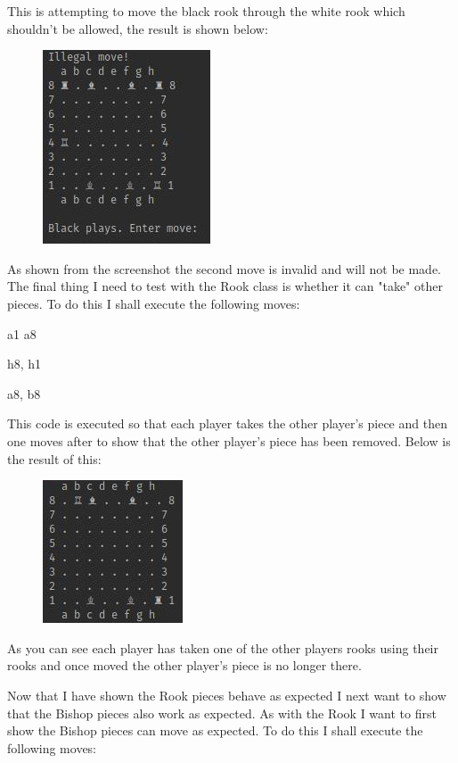 \documentclass[a4paper]{article}
\begin{document}
This is attempting to move the black rook through the white rook which shouldn't be allowed, the result is shown below:
\begin{figure}[h]
\centering
\includegraphics[scale=2.5]{nothingHappened}
\end{figure}

As shown from the screenshot the second move is invalid and will not be made. The final thing I need to test with the Rook class is whether it can "take" other pieces. To do this I shall execute the following moves:

\noindent a1 a8

\noindent h8, h1

\noindent a8, b8

This code is executed so that each player takes the other player's piece and then one moves after to show that the other player's piece has been removed. Below is the result of this: 
\begin{figure}[h]
\centering
\includegraphics[scale=2.5]{rookTakesRook}
\end{figure}

As you can see each player has taken one of the other players rooks using their rooks and once moved the other player's piece is no longer there. \newline

Now that I have shown the Rook pieces behave as expected I next want to show that the Bishop pieces also work as expected. As with the Rook I want to first show the Bishop pieces can move as expected. To do this I shall execute the following moves:
\end{document}
